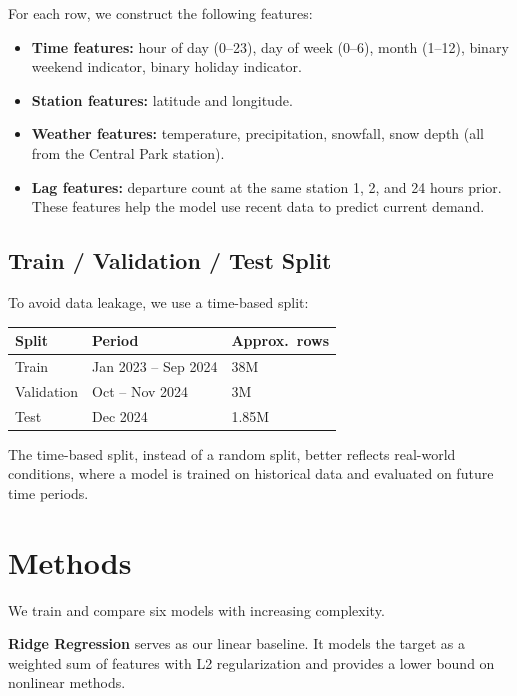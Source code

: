 \documentclass{article}
\begin{document}
For each row, we construct the following features:

\begin{itemize}
  \item \textbf{Time features:} hour of day (0--23), day of week (0--6),
        month (1--12), binary weekend indicator, binary holiday indicator.
  \item \textbf{Station features:} latitude and longitude.
  \item \textbf{Weather features:} temperature, precipitation, snowfall,
        snow depth (all from the Central Park station).
  \item \textbf{Lag features:} departure count at the same station 1, 2, and 24
        hours prior. These features help the model use recent data to predict current demand.
\end{itemize}

\subsection{Train / Validation / Test Split}

To avoid data leakage, we use a time-based split:

\begin{center}
\begin{tabular}{lll}
\toprule
Split & Period & Approx.\ rows \\
\midrule
Train & Jan 2023 -- Sep 2024 & 38M \\
Validation & Oct -- Nov 2024 & 3M \\
Test & Dec 2024 & 1.85M \\
\bottomrule
\end{tabular}
\end{center}

The time-based split, instead of a random split, better reflects real-world conditions, where a model is trained on historical data and evaluated on future time periods.

\section{Methods}

We train and compare six models with increasing complexity.

\textbf{Ridge Regression} serves as our linear baseline. It models the target
as a weighted sum of features with L2 regularization and provides a lower bound
on nonlinear methods.
\end{document}
